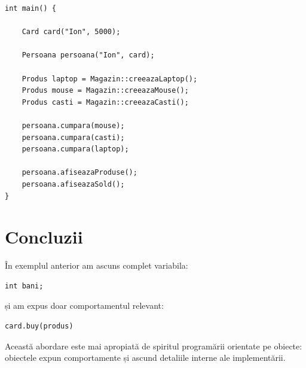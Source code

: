 \documentclass[12pt,a4paper]{article}
\begin{document}
\begin{lstlisting}
int main() {

    Card card("Ion", 5000);

    Persoana persoana("Ion", card);

    Produs laptop = Magazin::creeazaLaptop();
    Produs mouse = Magazin::creeazaMouse();
    Produs casti = Magazin::creeazaCasti();

    persoana.cumpara(mouse);
    persoana.cumpara(casti);
    persoana.cumpara(laptop);

    persoana.afiseazaProduse();
    persoana.afiseazaSold();
}
\end{lstlisting}

\section{Concluzii}

În exemplul anterior am ascuns complet variabila:

\begin{lstlisting}
int bani;
\end{lstlisting}

și am expus doar comportamentul relevant:

\begin{lstlisting}
card.buy(produs)
\end{lstlisting}

Această abordare este mai apropiată de spiritul programării orientate pe obiecte: obiectele expun comportamente și ascund detaliile interne ale implementării.
\end{document}
